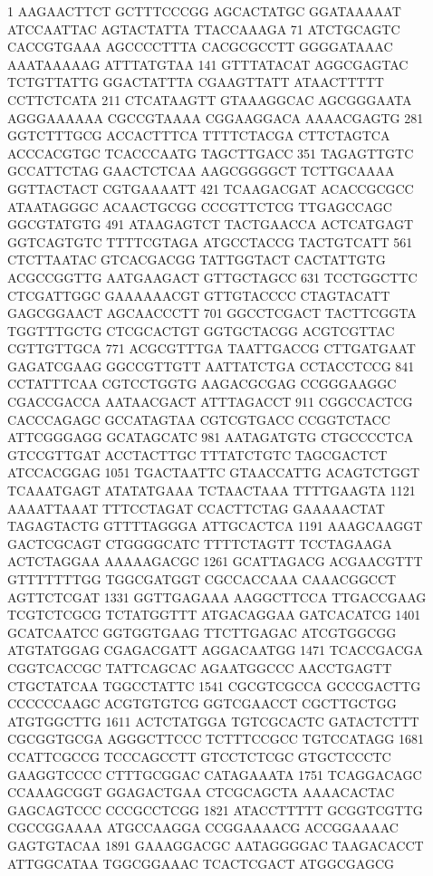 \begin{addmargin}{0.025\textwidth}

  \begin{footnotesize}
\begin{LVerbatim}[commandchars=\\\{\}]

   1 AAGAACTTCT GCTTTCCCGG AGCACTATGC GGATAAAAAT ATCCAATTAC AGTACTATTA TTACCAAAGA
  71 ATCTGCAGTC CACCGTGAAA AGCCCCTTTA CACGCGCCTT GGGGATAAAC AAATAAAAAG ATTTATGTAA
 141 GTTTATACAT AGGCGAGTAC TCTGTTATTG GGACTATTTA CGAAGTTATT ATAACTTTTT CCTTCTCATA
 211 CTCATAAGTT GTAAAGGCAC AGCGGGAATA AGGGAAAAAA CGCCGTAAAA CGGAAGGACA AAAACGAGTG
 281 GGTCTTTGCG ACCACTTTCA TTTTCTACGA CTTCTAGTCA ACCCACGTGC TCACCCAATG TAGCTTGACC
 351 TAGAGTTGTC GCCATTCTAG GAACTCTCAA AAGCGGGGCT TCTTGCAAAA GGTTACTACT CGTGAAAATT
 421 TCAAGACGAT ACACCGCGCC ATAATAGGGC ACAACTGCGG CCCGTTCTCG TTGAGCCAGC GGCGTATGTG
 491 ATAAGAGTCT TACTGAACCA ACTCATGAGT GGTCAGTGTC TTTTCGTAGA ATGCCTACCG TACTGTCATT
 561 CTCTTAATAC GTCACGACGG TATTGGTACT CACTATTGTG ACGCCGGTTG AATGAAGACT GTTGCTAGCC
 631 TCCTGGCTTC CTCGATTGGC GAAAAAACGT GTTGTACCCC CTAGTACATT GAGCGGAACT AGCAACCCTT
 701 GGCCTCGACT TACTTCGGTA TGGTTTGCTG CTCGCACTGT GGTGCTACGG ACGTCGTTAC CGTTGTTGCA
 771 ACGCGTTTGA TAATTGACCG CTTGATGAAT GAGATCGAAG GGCCGTTGTT AATTATCTGA CCTACCTCCG
 841 CCTATTTCAA CGTCCTGGTG AAGACGCGAG CCGGGAAGGC CGACCGACCA AATAACGACT ATTTAGACCT
 911 CGGCCACTCG CACCCAGAGC GCCATAGTAA CGTCGTGACC CCGGTCTACC ATTCGGGAGG GCATAGCATC
 981 AATAGATGTG CTGCCCCTCA GTCCGTTGAT ACCTACTTGC TTTATCTGTC TAGCGACTCT ATCCACGGAG
1051 TGACTAATTC GTAACCATTG ACAGTCTGGT TCAAATGAGT ATATATGAAA TCTAACTAAA TTTTGAAGTA
1121 AAAATTAAAT TTTCCTAGAT CCACTTCTAG GAAAAACTAT TAGAGTACTG GTTTTAGGGA ATTGCACTCA
1191 AAAGCAAGGT GACTCGCAGT CTGGGGCATC TTTTCTAGTT TCCTAGAAGA ACTCTAGGAA AAAAAGACGC
1261 GCATTAGACG ACGAACGTTT GTTTTTTTGG TGGCGATGGT CGCCACCAAA CAAACGGCCT AGTTCTCGAT
1331 GGTTGAGAAA AAGGCTTCCA TTGACCGAAG TCGTCTCGCG TCTATGGTTT ATGACAGGAA GATCACATCG
1401 GCATCAATCC GGTGGTGAAG TTCTTGAGAC ATCGTGGCGG ATGTATGGAG CGAGACGATT AGGACAATGG
1471 TCACCGACGA CGGTCACCGC TATTCAGCAC AGAATGGCCC AACCTGAGTT CTGCTATCAA TGGCCTATTC
1541 CGCGTCGCCA GCCCGACTTG CCCCCCAAGC ACGTGTGTCG GGTCGAACCT CGCTTGCTGG ATGTGGCTTG
1611 ACTCTATGGA TGTCGCACTC GATACTCTTT CGCGGTGCGA AGGGCTTCCC TCTTTCCGCC TGTCCATAGG
1681 CCATTCGCCG TCCCAGCCTT GTCCTCTCGC GTGCTCCCTC GAAGGTCCCC CTTTGCGGAC CATAGAAATA
1751 TCAGGACAGC CCAAAGCGGT GGAGACTGAA CTCGCAGCTA AAAACACTAC GAGCAGTCCC CCCGCCTCGG
1821 ATACCTTTTT GCGGTCGTTG CGCCGGAAAA ATGCCAAGGA CCGGAAAACG ACCGGAAAAC GAGTGTACAA
1891 GAAAGGACGC AATAGGGGAC TAAGACACCT ATTGGCATAA TGGCGGAAAC TCACTCGACT ATGGCGAGCG

\end{LVerbatim}
\end{footnotesize}
\end{addmargin}
